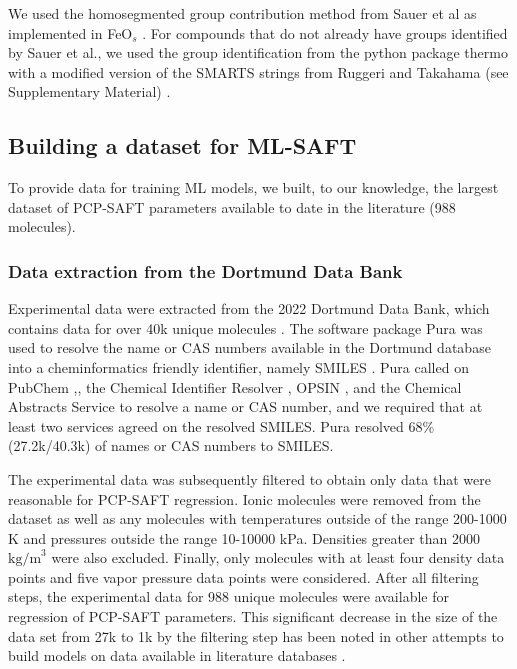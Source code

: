 We used the homosegmented group contribution method from Sauer et al \cite{Sauer2014} as implemented in FeO$_{s}$ \cite{Rehner2023}. For compounds that do not already have groups identified by Sauer et al., we used the group identification from the python package thermo\cite{thermopython} with a modified version of the SMARTS strings from Ruggeri and Takahama (see Supplementary Material) \cite{Ruggeri2016}.

\subsection{Building a dataset for ML-SAFT}\label{subsec:data_set}

To provide data for training ML models, we built, to our knowledge, the largest dataset of PCP-SAFT parameters available to date in the literature (988 molecules).

\subsubsection{Data extraction from the Dortmund Data Bank}

Experimental data were extracted from the 2022 Dortmund Data Bank, which contains data for over 40k unique molecules \cite{dortmunddatabank}. The software package Pura was used to resolve the name or CAS numbers available in the Dortmund database into a cheminformatics friendly identifier, namely SMILES \cite{purapython}. Pura called on PubChem \cite{Kim2020},, the Chemical Identifier Resolver \cite{cir}, OPSIN \cite{Lowe2011}, and the Chemical Abstracts Service\cite{commonchem} to resolve a name or CAS number, and we required that at least two services agreed on the resolved SMILES. Pura resolved 68\% (27.2k/40.3k) of names or CAS numbers to SMILES. 

The experimental data was subsequently filtered to obtain only data that were reasonable for PCP-SAFT regression. Ionic molecules were removed from the dataset as well as any molecules with temperatures outside of the range 200-1000 K and pressures outside the range 10-10000 kPa. Densities greater than 2000 $\text{kg/m}^{3}$ were also excluded. Finally, only molecules with at least four density data points and five vapor pressure data points were considered. After all filtering steps, the experimental data for 988 unique molecules were available for regression of PCP-SAFT parameters. This significant decrease in the size of the data set from 27k to 1k by the filtering step has been noted in other attempts to build models on data available in literature databases \cite{Fitzner2020, Gao2018}. 

